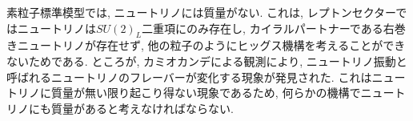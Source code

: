%
%
素粒子標準模型では, ニュートリノには質量がない.
これは, レプトンセクターではニュートリノは$SU(2)_L$二重項にのみ存在し, カイラルパートナーである右巻きニュートリノが存在せず, 他の粒子のようにヒッグス機構を考えることができないためである.
ところが, カミオカンデによる観測により, ニュートリノ振動と呼ばれるニュートリノのフレーバーが変化する現象が発見された\cite{collaborationDirectEvidenceNeutrino2002,collaborationEvidenceOscillationAtmospheric1998,collaborationFirstResultsKamLAND2003}.
これはニュートリノに質量が無い限り起こり得ない現象である\cite{pontecorvoNeutrinoExperimentsProblem1967,makiRemarksUnifiedModel1962}ため, 何らかの機構でニュートリノにも質量があると考えなければならない.

